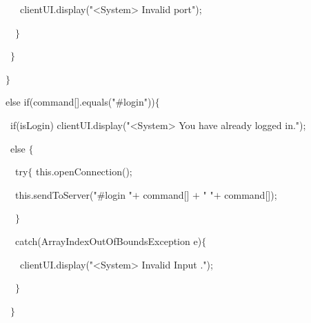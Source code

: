 {{\hlstd }{\hlstd\ \ \ \ \ \ }{\hlstd clientUI}{\hlsym .}{\hlstd }{\hlkwd display}{\hlstd }{\hlsym (}{\hlstd }{\hlstr "$\mathord{<}$System$\mathord{>}$ Invalid port"}{\hlstd }{\hlsym );}\leavevmode\par
{\hlstd }{\hlstd\ \ \ \ \ }{\hlstd }{\hlsym $\}$}\leavevmode\par
{\hlstd }{\hlstd\ \ \ \ }{\hlstd }{\hlsym $\}$}\leavevmode\par
{\hlstd }{\hlstd\ \ \ }{\hlstd }{\hlsym $\}$}\leavevmode\par
{\hlstd }{\hlstd\ \ \ }{\hlstd }{\hlkwa else if}{\hlstd }{\hlsym (}{\hlstd command}{\hlsym [}{\hlstd }{}{\hlstd }{\hlsym ].}{\hlstd }{\hlkwd equals}{\hlstd }{\hlsym (}{\hlstd }{\hlstr "\#login"}{\hlstd }{\hlsym ))$\{$}\leavevmode\par
{\hlstd }{\hlstd\ \ \ \ }{\hlstd }{\hlkwa if}{\hlstd }{\hlsym (}{\hlstd isLogin}{\hlsym ) }{\hlstd clientUI}{\hlsym .}{\hlstd }{\hlkwd display}{\hlstd }{\hlsym (}{\hlstd }{\hlstr "$\mathord{<}$System$\mathord{>}$ You have already logged in."}{\hlstd }{\hlsym );}\leavevmode\par
{\hlstd }{\hlstd\ \ \ \ }{\hlstd }{\hlkwa else }{\hlstd }{\hlsym $\{$}\leavevmode\par
{\hlstd }{\hlstd\ \ \ \ \ }{\hlstd }{\hlkwa try}{\hlstd }{\hlsym $\{$ }{\hlstd }{\hlkwa this}{\hlstd }{\hlsym .}{\hlstd }{\hlkwd openConnection}{\hlstd }{\hlsym ();}\leavevmode\par
{\hlstd }{\hlstd\ \ \ \ \ }{\hlstd }{\hlkwa this}{\hlstd }{\hlsym .}{\hlstd }{\hlkwd sendToServer}{\hlstd }{\hlsym (}{\hlstd }{\hlstr "\#login "}{\hlstd  }{\hlsym $\mathord{+}$ }{\hlstd command}{\hlsym [}{\hlstd }{}{\hlstd }{\hlsym ] $\mathord{+}$ }{\hlstd }{\hlstr " "}{\hlstd  }{\hlsym $\mathord{+}$ }{\hlstd command}{\hlsym [}{\hlstd }{}{\hlstd }{\hlsym ]);}\leavevmode\par
{\hlstd }{\hlstd\ \ \ \ \ }{\hlstd }{\hlsym $\}$}\leavevmode\par
{\hlstd }{\hlstd\ \ \ \ \ }{\hlstd }{\hlkwa catch}{\hlstd }{\hlsym (}{\hlstd }{\hlkwc ArrayIndexOutOfBoundsException }{\hlstd e}{\hlsym )$\{$}\leavevmode\par
{\hlstd }{\hlstd\ \ \ \ \ \ }{\hlstd clientUI}{\hlsym .}{\hlstd }{\hlkwd display}{\hlstd }{\hlsym (}{\hlstd }{\hlstr "$\mathord{<}$System$\mathord{>}$ Invalid Input ."}{\hlstd }{\hlsym );}\leavevmode\par
{\hlstd }{\hlstd\ \ \ \ \ }{\hlstd }{\hlsym $\}$}\leavevmode\par
{\hlstd }{\hlstd\ \ \ \ }{\hlstd }{\hlsym $\}$}\leavevmode\par
}
